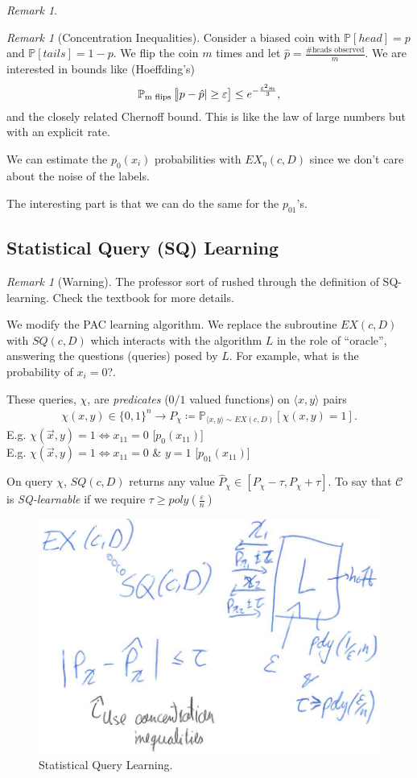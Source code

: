 \documentclass[12pt, letterpaper]{article}
\numberwithin{equation}{section} %
\newcommand{\mb}{\mathbb}
\newcommand{\mc}{\mathcal}
\newcommand{\ve}{\varepsilon}
\theoremstyle{definition}
\theoremstyle{remark}
\newtheorem{remark}[theorem]{Remark}
\begin{document}
\begin{remark}
\begin{remark}[Concentration Inequalities]
Consider a biased coin with $\mb P[head] = p$ and $\mb P[tails]=1-p$. We flip the coin $m$ times and let $\hat p = \frac{\textrm{\# heads observed}}{m}$. We are interested in bounds like (Hoeffding's)
\begin{align}
\mb P_{\textrm{m flips}}\left[\abs{p-\hat p}\geq \ve\right] \leq e^{-\frac{\ve^2m}{3}},
\end{align}
and the closely related Chernoff bound. This is like the law of large numbers but with an explicit rate.
\end{remark}
We can estimate the $p_0(x_i)$ probabilities with $EX_\eta(c, D)$ since we don't care about the noise of the labels.
\end{remark}
The interesting part is that we can do the same for the $p_{01}$'s.

\subsection{Statistical Query (SQ) Learning}
\begin{remark}[Warning]
The professor sort of rushed through the definition of SQ-learning. Check the textbook for more details.
\end{remark}
We modify the PAC learning algorithm. We replace the subroutine $EX(c,D)$ with $SQ(c,D)$ which interacts with the algorithm $L$ in the role of ``oracle'', answering the questions (queries) posed by $L$. For example, what is the probability of $x_i=0$?.

These queries, $\chi$, are \emph{predicates} ($0/1$ valued functions) on $\langle x, y\rangle$ pairs
\begin{align}
\chi(x,y)\in \lbrace 0, 1\rbrace^n \longrightarrow P_{\chi} \coloneqq \mb P_{\langle x,y\rangle\sim EX(c,D)}[\chi(x,y)=1].
\end{align}
E.g. $\chi(\vec x, y) = 1 \iff x_{11}=0$ [$p_{0}(x_{11})$]\\
E.g. $\chi(\vec x, y) = 1 \iff x_{11}=0$ \& $y=1$ [$p_{01}(x_{11})$]

On query $\chi$, $SQ(c,D)$ returns any value $\hat P_\chi  \in \left[P_\chi -\tau, P_\chi +\tau\right]$. To say that $\mc C$ is \emph{SQ-learnable} if  we require $\tau \geq poly\left(\frac\ve n\right)$
\begin{figure}[H]
\centering
\includegraphics[width=0.6\linewidth]{../img/sq-learning.png}
\caption{Statistical Query Learning.}
\label{fig:graph}
\end{figure}
\end{document}
